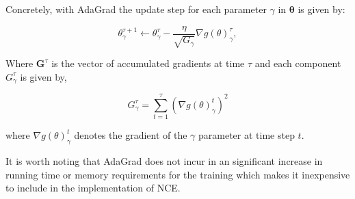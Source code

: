 Concretely, with AdaGrad the update step for each parameter $\gamma$ in $\boldsymbol{\theta}$ is given by:

\begin{equation}
\theta^{\tau + 1}_{\gamma} \leftarrow \theta^{\tau}_{\gamma} - \frac{\eta}{\sqrt{G_{\gamma}}} \nabla g(\theta)^{\tau}_{\gamma},
\end{equation}

Where $\mathbf{G}^{\tau}$ is the vector of accumulated gradients at time $\tau$ and each component $G^{\tau}_\gamma$ is given by,

\begin{equation}
G^{\tau}_{\gamma} = \sum_{t=1}^{\tau} \left(\nabla g(\theta)^{t}_{\gamma}\right)^{2}
\label{eq:adagrad-g}
\end{equation}

where $\nabla g(\theta)^{t}_{\gamma}$ denotes the gradient of the $\gamma$ parameter at time step $t$.

It is worth noting that AdaGrad does not incur in an significant increase in running time or memory requirements for the training which makes it inexpensive to include in the implementation of NCE.


